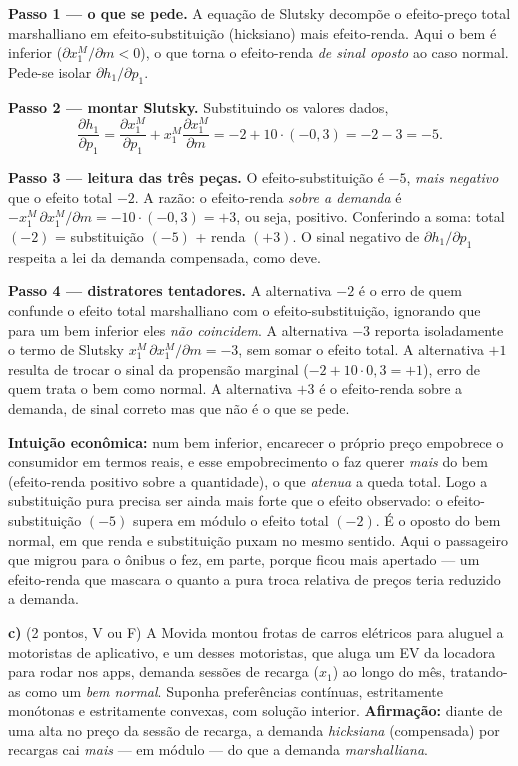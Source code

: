 \begin{solucao}
\textbf{Passo 1 --- o que se pede.} A equação de Slutsky decompõe o efeito-preço total marshalliano em efeito-substituição (hicksiano) mais efeito-renda. Aqui o bem é inferior ($\partial x_1^{M}/\partial m<0$), o que torna o efeito-renda \emph{de sinal oposto} ao caso normal. Pede-se isolar $\partial h_1/\partial p_1$.

\textbf{Passo 2 --- montar Slutsky.} Substituindo os valores dados,
\[
\frac{\partial h_1}{\partial p_1}=\frac{\partial x_1^{M}}{\partial p_1}+x_1^{M}\frac{\partial x_1^{M}}{\partial m}=-2+10\cdot(-0{,}3)=-2-3=-5.
\]

\textbf{Passo 3 --- leitura das três peças.} O efeito-substituição é $-5$, \emph{mais negativo} que o efeito total $-2$. A razão: o efeito-renda \emph{sobre a demanda} é $-x_1^{M}\,\partial x_1^{M}/\partial m=-10\cdot(-0{,}3)=+3$, ou seja, positivo. Conferindo a soma: total $(-2)$ = substituição $(-5)$ + renda $(+3)$. O sinal negativo de $\partial h_1/\partial p_1$ respeita a lei da demanda compensada, como deve.

\textbf{Passo 4 --- distratores tentadores.} A alternativa $-2$ é o erro de quem confunde o efeito total marshalliano com o efeito-substituição, ignorando que para um bem inferior eles \emph{não coincidem}. A alternativa $-3$ reporta isoladamente o termo de Slutsky $x_1^{M}\,\partial x_1^{M}/\partial m=-3$, sem somar o efeito total. A alternativa $+1$ resulta de trocar o sinal da propensão marginal ($-2+10\cdot 0{,}3=+1$), erro de quem trata o bem como normal. A alternativa $+3$ é o efeito-renda sobre a demanda, de sinal correto mas que não é o que se pede.

\textbf{Intuição econômica:} num bem inferior, encarecer o próprio preço empobrece o consumidor em termos reais, e esse empobrecimento o faz querer \emph{mais} do bem (efeito-renda positivo sobre a quantidade), o que \emph{atenua} a queda total. Logo a substituição pura precisa ser ainda mais forte que o efeito observado: o efeito-substituição $(-5)$ supera em módulo o efeito total $(-2)$. É o oposto do bem normal, em que renda e substituição puxam no mesmo sentido. Aqui o passageiro que migrou para o ônibus o fez, em parte, porque ficou mais apertado --- um efeito-renda que mascara o quanto a pura troca relativa de preços teria reduzido a demanda.
\end{solucao}

\textbf{c)} (2 pontos, V ou F) A Movida montou frotas de carros elétricos para aluguel a motoristas de aplicativo, e um desses motoristas, que aluga um EV da locadora para rodar nos apps, demanda sessões de recarga ($x_1$) ao longo do mês, tratando-as como um \emph{bem normal}. Suponha preferências contínuas, estritamente monótonas e estritamente convexas, com solução interior. \textbf{Afirmação:} diante de uma alta no preço da sessão de recarga, a demanda \emph{hicksiana} (compensada) por recargas cai \emph{mais} --- em módulo --- do que a demanda \emph{marshalliana}.

